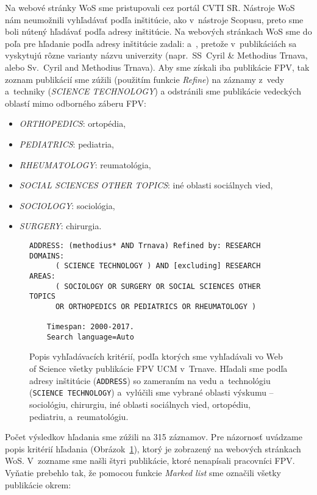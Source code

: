 Na webové stránky WoS sme pristupovali cez portál CVTI SR.  Nástroje WoS nám
neumožnili vyhľadávať podľa inštitúcie, ako v~nástroje Scopusu, preto sme boli
nútený hľadávať podľa adresy inštitúcie.  Na webových stránkach WoS sme do poľa
pre hľadanie podľa adresy inštitúcie zadali:  a~,
pretože v~publikáciách sa vyskytujú rôzne varianty názvu univerzity
(napr.~SS~Cyril \& Methodius Trnava, alebo Sv.~Cyril and Methodius Trnava).
Aby sme získali iba publikácie FPV, tak zoznam publikácií sme zúžili (použitím
funkcie \emph{Refine}) na záznamy z~vedy a~techniky (\emph{SCIENCE TECHNOLOGY})
a odstránili sme publikácie vedeckých oblastí mimo odborného záberu FPV:

\begin{itemize}
\item \emph{ORTHOPEDICS}: ortopédia,
\item \emph{PEDIATRICS}: pediatria,
\item \emph{RHEUMATOLOGY}: reumatológia,
\item \emph{SOCIAL SCIENCES OTHER TOPICS}: iné oblasti sociálnych vied,
\item \emph{SOCIOLOGY}: sociológia,
\item \emph{SURGERY}: chirurgia.
\end{itemize}

\begin{figure}
  \footnotesize
  \begin{Verbatim}[frame=single]
    ADDRESS: (methodius* AND Trnava) Refined by: RESEARCH DOMAINS:
      ( SCIENCE TECHNOLOGY ) AND [excluding] RESEARCH AREAS:
      ( SOCIOLOGY OR SURGERY OR SOCIAL SCIENCES OTHER TOPICS
      OR ORTHOPEDICS OR PEDIATRICS OR RHEUMATOLOGY )

    Timespan: 2000-2017.
    Search language=Auto
  \end{Verbatim}
  \vspace*{-4mm}
  \caption[Popis kritérií vyhľadávania vo WoS pre FPV]%
  {Popis vyhľadávacích kritérií, podľa ktorých sme vyhľadávali vo Web of Science
    všetky publikácie FPV UCM v~Trnave.  Hľadali sme podľa adresy inštitúcie
    (\texttt{ADDRESS}) so zameraním na vedu a~technológiu (\texttt{SCIENCE
      TECHNOLOGY}) a~vylúčili sme vybrané oblasti výskumu -- sociológiu,
    chirurgiu, iné oblasti sociálnych vied, ortopédiu, pediatriu,
    a~reumatológiu.}
  \label{fig:wos.query}
\end{figure}


Počet výsledkov hľadania sme zúžili na 315 záznamov.  Pre názornosť uvádzame
popis kritérií hľadania (Obrázok~\ref{fig:wos.query}), ktorý je zobrazený na
webových stránkach WoS.  V~zozname sme našli štyri publikácie, ktoré nenapísali
pracovníci FPV.  Vyňatie prebehlo tak, že pomocou funkcie \emph{Marked list} sme
označili všetky publikácie okrem:

